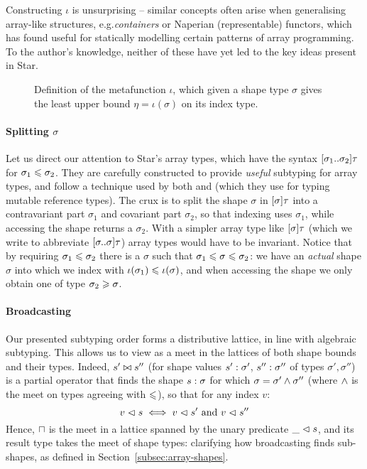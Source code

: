 Constructing $\iota$ is unsurprising -- similar concepts often arise when generalising array-like structures, e.g.\@ \textit{containers} \cite{containers} or Naperian (representable) functors, which \textcite{naperian-apl} has found useful for statically modelling certain patterns of array programming. To the author's knowledge, neither of these have yet led to the key ideas present in Star.

\begin{figure}
    \centering
    
    \caption{Definition of the metafunction $\iota$, which given a shape type $\sigma$ gives the least upper bound $\eta = \iota(\sigma)$ on its index type.}
    \label{fig:iota}
\end{figure}

\paragraph{Splitting $\sigma$} Let us direct our attention to Star's array types, which have the syntax $\sarraytype{\sigma_1}{\sigma_2}{\tau}$ for $\sigma_1 \leqslant \sigma_2$. They are carefully constructed to provide \emph{useful} subtyping for array types, and follow a technique used by both \textcite{dolan-thesis} and \textcite{pottier-thesis} (which they use for typing mutable reference types). The crux is to split the shape $\sigma$ in $\sonebound{\sigma}\tau$ into a contravariant part $\sigma_1$ and covariant part $\sigma_2$, so that indexing uses $\sigma_1$, while accessing the shape returns a $\sigma_2$. With a simpler array type like $\sonebound{\sigma}\tau$ (which we write to abbreviate $\sarraytype{\sigma}{\sigma}{\tau}$) array types would have to be invariant. Notice that by requiring $\sigma_1 \leqslant \sigma_2$ there is a $\sigma$ such that $\sigma_1 \leqslant \sigma \leqslant \sigma_2$: we have an \emph{actual} shape $\sigma$ into which we index with $\iota(\sigma_1) \leqslant \iota(\sigma)$, and when accessing the shape we only obtain one of type $\sigma_2 \geqslant \sigma$.

\paragraph{Broadcasting}
Our presented subtyping order forms a distributive lattice, in line with algebraic subtyping. 
This allows us to view as a meet in the lattices of both shape bounds and their types. 
Indeed, $s' \bowtie s''$ (for shape values $s': \sigma'$, $s'' : \sigma''$ of types $\sigma', \sigma''$) is a partial operator that finds the shape $s : \sigma$ for which $\sigma = \sigma' \land \sigma''$ (where $\land$ is the meet on types agreeing with $\leqslant$), so that for any index $v$: 
$$ v \vartriangleleft s \iff v \vartriangleleft s' \text{ and } v \vartriangleleft s'' $$
Hence, $\sqcap$ is the meet in a lattice spanned by the unary predicate $\_ \vartriangleleft s$, and its result type takes the meet of shape types: clarifying how broadcasting finds sub-shapes, as defined in Section~\ref{subsec:array-shapes}.

